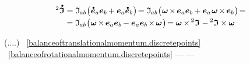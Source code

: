 \nopagebreak\vspace{-0.2em}\begin{multline*}
\inertiatensordotabove
= \inertiatensorcomponents{ab} \bigl( \hspace{.1ex} \mathdotabove{\bm{e}}_a \bm{e}_b \hspace{-0.1ex} + \bm{e}_a \mathdotabove{\bm{e}}_b \hspace{.12ex} \bigr) \hspace{-0.33ex}
= \inertiatensorcomponents{ab} \bigl( \hspace{.1ex} \bm{\omega} \hspace{-0.2ex} \times \hspace{-0.2ex} \bm{e}_a \bm{e}_b \hspace{-0.1ex} + \bm{e}_a \hspace{.2ex} \bm{\omega} \hspace{-0.2ex} \times \hspace{-0.2ex} \bm{e}_b \hspace{.12ex} \bigr) \hspace{-0.33ex}
=
\\[-0.1em]
%
= \inertiatensorcomponents{ab} \bigl( \hspace{.1ex} \bm{\omega} \hspace{-0.2ex} \times \hspace{-0.2ex} \bm{e}_a \bm{e}_b \hspace{-0.1ex} - \bm{e}_a \bm{e}_b \hspace{-0.2ex} \times \hspace{-0.2ex} \bm{\omega} \hspace{.12ex} \bigr) \hspace{-0.33ex}
= \bm{\omega} \hspace{-0.1ex} \times \hspace{-0.1ex} \inertiatensor \hspace{.1ex} - \inertiatensor \times \bm{\omega}
\end{multline*}

\textcolor{magenta}{}
(....)
~\eqref{balanceoftranslationalmomentum.discretepoints} ~\eqref{balanceofrotationalmomentum.discretepoints}
 \:---   \:---   

